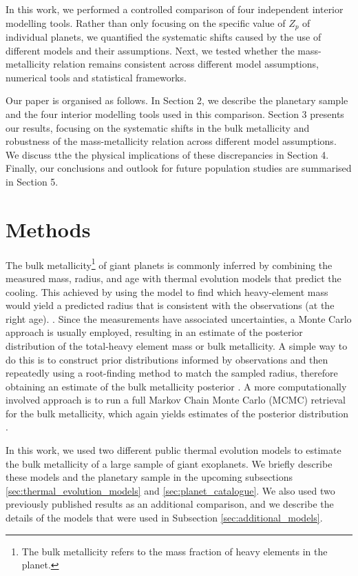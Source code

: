 \documentclass{aa}
\begin{document}
In this work, we performed a controlled comparison of four independent interior modelling tools. Rather than only focusing on the specific value of $Z_p$ of individual planets, we quantified the systematic shifts caused by the use of different models and their assumptions. Next, we tested whether the mass-metallicity relation remains consistent across different model assumptions, numerical tools and statistical frameworks.

Our paper is organised as follows. In Section 2, we describe the planetary sample and the four interior modelling tools used in this comparison. Section 3 presents our results, focusing on the systematic shifts in the bulk metallicity and robustness of the mass-metallicity relation across different model assumptions. We discuss tthe the physical implications of these discrepancies in Section 4. Finally, our conclusions and outlook for future population studies are summarised in Section 5.


\section{Methods}\label{sec:methods}
The bulk metallicity\footnote{The bulk metallicity refers to the mass fraction of heavy elements in the planet.} of giant planets is commonly inferred by combining the measured mass, radius, and age with thermal evolution models that predict the cooling. This achieved by using the model to find which heavy-element mass would yield a predicted radius that is consistent with the observations (at the right age). \citep[e.g.,][]{fortney_planetary_2007,thorngren_mass-metallicity_2016}. Since the measurements have associated uncertainties, a Monte Carlo approach is usually employed, resulting in an estimate of the posterior distribution of the total-heavy element mass or bulk metallicity. A simple way to do this is to construct prior distributions informed by observations and then repeatedly using a root-finding method to match the sampled radius, therefore obtaining an estimate of the bulk metallicity posterior \citep[e.g.,][]{thorngren_mass-metallicity_2016,muller_towards_2023}. A more computationally involved approach is to run a full Markov Chain Monte Carlo (MCMC) retrieval for the bulk metallicity, which again yields estimates of the posterior distribution \citep[e.g.,][]{acuna_characterisation_2021,sing_warm_2024, ashtari_gems_2026}.

In this work, we used two different public thermal evolution models to estimate the bulk metallicity of a large sample of giant exoplanets. We briefly describe these models and the planetary sample in the upcoming subsections \ref{sec:thermal_evolution_models} and \ref{sec:planet_catalogue}. We also used two previously published results as an additional comparison, and we describe the details of the models that were used in Subsection \ref{sec:additional_models}.
\end{document}
